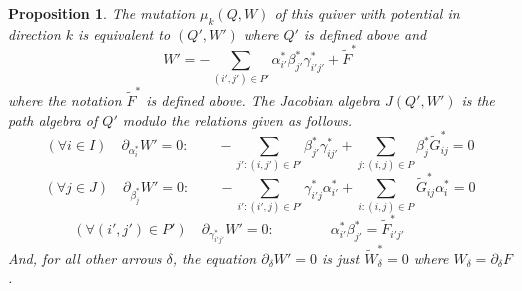 \documentclass[10pt]{amsart}
\newtheorem{prop}[theo]{Proposition}
\theoremstyle{definition}
\begin{document}
\begin{prop}\label{prop: formula for mutation of W}  
The mutation $\mu_k(Q,W)$ of this quiver with potential in direction $k$ is equivalent to $(Q',W')$ where $Q'$ is defined above and
\[
	W'=-\sum_{(i',j')\in P'} \alpha_{i'}^\ast\beta_{j'}^\ast\gamma_{i'j'}^\ast+\widetilde F^\ast
\]
where the notation $\widetilde F^\ast$ is defined above. The Jacobian algebra $J(Q',W')$ is the path algebra of $Q'$ modulo the relations given as follows.
\[
	(\forall i\in I)\quad \partial_{\alpha_i^\ast}W'=0:\qquad -\sum_{j':(i,j')\in P'} \beta_{j'}^\ast\gamma_{ij'}^\ast +
	\sum_{j:(i,j)\in P}\beta_{j}^\ast \widetilde G_{ij}^\ast=0
\]
\[
	(\forall j\in J)\quad \partial_{\beta_j^\ast}W'=0:\qquad -\sum_{i': (i',j)\in P'} \gamma_{i'j}^\ast\alpha_{i'}^\ast+\sum_{i:(i,j)\in P} \widetilde G_{ij}^\ast\alpha_{i}^\ast =0
\]
\[
	(\forall (i',j')\in P')\quad \partial_{\gamma_{i'j'}^\ast}W'=0:\qquad\qquad \alpha_{i'}^\ast\beta_{j'}^\ast=\widetilde F_{i'j'}^\ast\qquad\quad 
\]
And, for all other arrows $\delta$, the equation $\partial_\delta W'=0$ is just $\widetilde W_\delta^\ast=0$ where $W_\delta=\partial_\delta  F$.
\end{prop}
\end{document}

